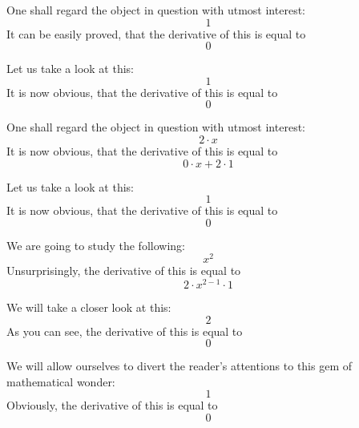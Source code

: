 \documentclass{article}
\begin{document}
One shall regard the object in question with utmost interest:
\begin{equation}
1 
\end{equation}
It can be easily proved, that the derivative of this is equal to
\begin{equation}
0 
\end{equation}

Let us take a look at this:
\begin{equation}
1 
\end{equation}
It is now obvious, that the derivative of this is equal to
\begin{equation}
0 
\end{equation}

One shall regard the object in question with utmost interest:
\begin{equation}
2 \cdot x 
\end{equation}
It is now obvious, that the derivative of this is equal to
\begin{equation}
0 \cdot x + 2 \cdot 1 
\end{equation}

Let us take a look at this:
\begin{equation}
1 
\end{equation}
It is now obvious, that the derivative of this is equal to
\begin{equation}
0 
\end{equation}

We are going to study the following:
\begin{equation}
x ^{2 } 
\end{equation}
Unsurprisingly, the derivative of this is equal to
\begin{equation}
2 \cdot x ^{2 - 1 } \cdot 1 
\end{equation}

We will take a closer look at this:
\begin{equation}
2 
\end{equation}
As you can see, the derivative of this is equal to
\begin{equation}
0 
\end{equation}

We will allow ourselves to divert the reader's attentions to this gem of mathematical wonder:
\begin{equation}
1 
\end{equation}
Obviously, the derivative of this is equal to
\begin{equation}
0 
\end{equation}
\end{document}
